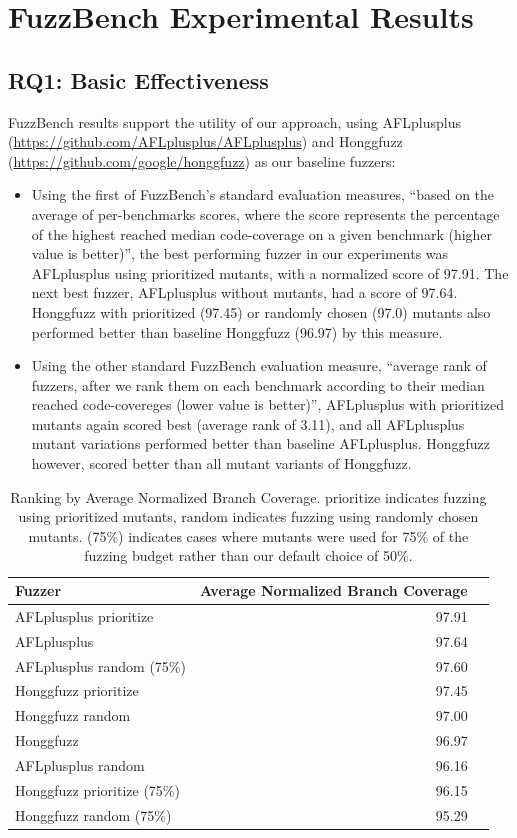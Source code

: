 \section{FuzzBench Experimental Results}

\subsection{RQ1: Basic Effectiveness}

FuzzBench results support the utility of our approach, using AFLplusplus (\url{https://github.com/AFLplusplus/AFLplusplus}) and Honggfuzz (\url{https://github.com/google/honggfuzz}) as our baseline fuzzers:

  \begin{itemize}
  \item Using the first of FuzzBench's standard evaluation measures, ``based on the average of per-benchmarks scores, where the score represents the percentage of the highest reached median code-coverage on a given benchmark (higher value is better)'', the best performing fuzzer in our experiments was AFLplusplus using prioritized mutants, with a normalized score of 97.91.  The next best fuzzer, AFLplusplus without mutants, had a score of 97.64.  Honggfuzz with prioritized (97.45) or randomly chosen (97.0) mutants also performed better than baseline Honggfuzz (96.97) by this measure.
    \item Using the other standard FuzzBench evaluation measure, ``average rank of fuzzers, after we rank them on each benchmark according to their median reached code-covereges (lower value is better)'', AFLplusplus with prioritized mutants again scored best (average rank of 3.11), and all AFLplusplus mutant variations performed better than baseline AFLplusplus.  Honggfuzz however, scored better than all mutant variants of Honggfuzz.
    \end{itemize}

    \begin{table}
      \begin{tabular}{l|r|r}
        Fuzzer & Average Normalized Branch Coverage \\
        \hline
        \hline
AFLplusplus prioritize & 97.91 \\
AFLplusplus  & 97.64 \\
AFLplusplus random (75\%) & 97.60 \\
Honggfuzz prioritize & 97.45 \\ 
Honggfuzz random & 97.00 \\
Honggfuzz & 96.97 \\
AFLplusplus random & 96.16 \\
Honggfuzz prioritize (75\%) & 96.15 \\
Honggfuzz random (75\%) & 95.29 \\
      \end{tabular}
      \caption{Ranking by Average Normalized Branch Coverage.  prioritize indicates fuzzing using prioritized mutants, random indicates fuzzing using randomly chosen mutants.  (75\%) indicates cases where mutants were used for 75\% of the fuzzing budget rather than our default choice of 50\%.}
      \label{tab:rankings1}
    \end{table}

